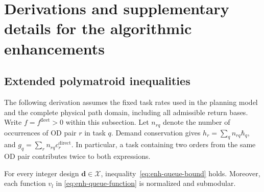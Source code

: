 \section{Derivations and supplementary details for the algorithmic enhancements}
\label{app:enhancements}

\subsection{Extended polymatroid inequalities}
\label{app:enh-queue}

The following derivation assumes the fixed task rates used in the planning model and the complete physical path domain, including all admissible return bases.
Write $f=f^{\mathrm{fleet}}>0$ within this subsection.
Let $n_{rq}$ denote the number of occurrences of OD pair $r$ in task $q$.
Demand conservation gives $h_r=\sum_q n_{rq}\hbar_q$, and $g_q=\sum_r n_{rq}c_r^{\mathrm{direct}}$.
In particular, a task containing two orders from the same OD pair contributes twice to both expressions.

\begin{proposition}
\label{prop:enh-queue-bound}
For every integer design $\boldsymbol d\in\mathcal X$, inequality~\eqref{eq:enh-queue-bound} holds.
Moreover, each function $v_l$ in \eqref{eq:enh-queue-function} is normalized and submodular.
\end{proposition}

